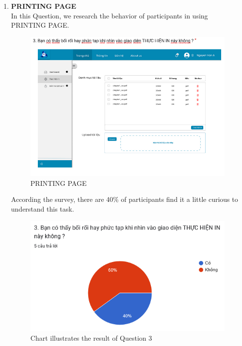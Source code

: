 \documentclass[a4paper]{report}
\begin{document}
\begin{enumerate}
    \item \textbf{PRINTING PAGE} \\
    In this Question, we research the behavior of participants in using PRINTING PAGE.
\begin{figure}[!h]
    \centering
    \includegraphics[width=0.8\linewidth]{images/image_uasbility/Q3_Stu.png}
    \caption{PRINTING PAGE}
    \label{fig:PRINTING PAGE}
\end{figure}
\newpage
According the survey, there are 40\% of participants find it a little curious to understand this task.
\begin{figure}[!h]
    \centering
    \includegraphics[width=0.8\linewidth]{images/image_uasbility/A3_Stu.png}
    \caption{Chart illustrates the result of Question 3}
    \label{fig:Chart illustrates the result of Question 3}
\end{figure}


\end{enumerate}
\end{document}

